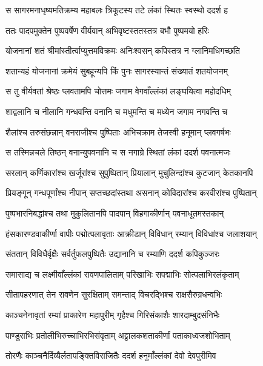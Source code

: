 
\twolineshloka
{स सागरमनाधृष्यमतिक्रम्य महाबलः}
{त्रिकूटस्य तटे लंकां स्थितः स्वस्थो ददर्श ह} %

\twolineshloka
{ततः पादपमुक्तेन पुष्पवर्षेण वीर्यवान्}
{अभिवृष्टस्ततस्तत्र बभौ पुष्पमयो हरिः} %

\twolineshloka
{योजनानां शतं श्रीमांस्तीर्त्वाप्युत्तमविक्रमः}
{अनिःश्वसन् कपिस्तत्र न ग्लानिमधिगच्छति} %

\twolineshloka
{शतान्यहं योजनानां क्रमेयं सुबहून्यपि}
{किं पुनः सागरस्यान्तं संख्यातं शतयोजनम्} %

\twolineshloka
{स तु वीर्यवतां श्रेष्ठः प्लवतामपि चोत्तमः}
{जगाम वेगवाँल्लंकां लङ्घयित्वा महोदधिम्} %

\twolineshloka
{शाद्वलानि च नीलानि गन्धवन्ति वनानि च}
{मधुमन्ति च मध्येन जगाम नगवन्ति च} %

\twolineshloka
{शैलांश्च तरुसंछन्नान् वनराजीश्च पुष्पिताः}
{अभिचक्राम तेजस्वी हनूमान् प्लवगर्षभः} %

\twolineshloka
{स तस्मिन्नचले तिष्ठन् वनान्युपवनानि च}
{स नगाग्रे स्थितां लंकां ददर्श पवनात्मजः} %

\twolineshloka
{सरलान् कर्णिकारांश्च खर्जूरांश्च सुपुष्पितान्}
{प्रियालान् मुचुलिन्दांश्च कुटजान् केतकानपि} %

\twolineshloka
{प्रियङ्गून् गन्धपूर्णांश्च नीपान् सप्तच्छदांस्तथा}
{असनान् कोविदारांश्च करवीरांश्च पुष्पितान्} %

\twolineshloka
{पुष्पभारनिबद्धांश्च तथा मुकुलितानपि}
{पादपान् विहगाकीर्णान् पवनाधूतमस्तकान्} %

\twolineshloka
{हंसकारण्डवाकीर्णा वापीः पद्मोत्पलावृताः}
{आक्रीडान् विविधान् रम्यान् विविधांश्च जलाशयान्} %

\twolineshloka
{संततान् विविधैर्वृक्षैः सर्वर्तुफलपुष्पितैः}
{उद्यानानि च रम्याणि ददर्श कपिकुञ्जरः} %

\twolineshloka
{समासाद्य च लक्ष्मीवाँल्लंकां रावणपालिताम्}
{परिखाभिः सपद्माभिः सोत्पलाभिरलंकृताम्} %

\twolineshloka
{सीतापहरणात् तेन रावणेन सुरक्षिताम्}
{समन्ताद् विचरद्भिश्च राक्षसैरुग्रधन्वभिः} %

\twolineshloka
{काञ्चनेनावृतां रम्यां प्राकारेण महापुरीम्}
{गृहैश्च गिरिसंकाशैः शारदाम्बुदसंनिभैः} %

\twolineshloka
{पाण्डुराभिः प्रतोलीभिरुच्चाभिरभिसंवृताम्}
{अट्टालकशताकीर्णां पताकाध्वजशोभिताम्} %

\twolineshloka
{तोरणैः काञ्चनैर्दिव्यैर्लतापङ्क्तिविराजितैः}
{ददर्श हनुमाँल्लंकां देवो देवपुरीमिव} %

